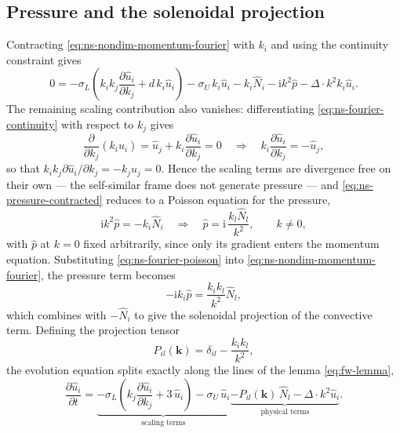 \subsection{Pressure and the solenoidal projection}\label{ssec:ns-projection}
Contracting \eqref{eq:ns-nondim-momentum-fourier} with $k_i$ and using the
continuity constraint gives
\begin{equation}\label{eq:ns-pressure-contracted}
  0 = -\sigma_L \left( k_i k_j \frac{\partial \hat{u}_i}{\partial k_j} + d\, k_i \hat{u}_i \right)
  - \sigma_U\, k_i \hat{u}_i
  - k_i \hat{N}_i
  - \mathrm{i} k^2 \hat{p}
  - \Delta \cdot k^2 k_i \hat{u}_i.
\end{equation}
The remaining scaling contribution also vanishes: differentiating
\eqref{eq:ns-fourier-continuity} with respect to $k_j$ gives
\begin{equation}\label{eq:ns-continuity-dk}
  \frac{\partial}{\partial k_j}\left( k_i \hat{u}_i \right)
  = \hat{u}_j + k_i \frac{\partial \hat{u}_i}{\partial k_j} = 0
  \quad\Longrightarrow\quad
  k_i \frac{\partial \hat{u}_i}{\partial k_j} = -\hat{u}_j,
\end{equation}
so that $k_i k_j \partial \hat{u}_i / \partial k_j = -k_j \hat{u}_j = 0$.
Hence the scaling terms are divergence free on their own --- the self-similar
frame does not generate pressure --- and \eqref{eq:ns-pressure-contracted}
reduces to a Poisson equation for the pressure,
\begin{equation}\label{eq:ns-fourier-poisson}
  \mathrm{i} k^2 \hat{p} = -k_i \hat{N}_i
  \quad\Longrightarrow\quad
  \hat{p} = \mathrm{i}\,\frac{k_l \hat{N}_l}{k^2},
  \qquad k \neq 0,
\end{equation}
with $\hat{p}$ at $k = 0$ fixed arbitrarily, since only its gradient enters
the momentum equation. Substituting \eqref{eq:ns-fourier-poisson} into
\eqref{eq:ns-nondim-momentum-fourier}, the pressure term becomes
\begin{equation}\label{eq:ns-fourier-pressure-substituted}
  -\mathrm{i} k_i \hat{p} = \frac{k_i k_l}{k^2} \hat{N}_l,
\end{equation}
which combines with $-\hat{N}_i$ to give the solenoidal projection of the
convective term. Defining the projection tensor
\begin{equation}\label{eq:ns-projection-tensor}
  P_{il}(\mathbf{k}) = \delta_{il} - \frac{k_i k_l}{k^2},
\end{equation}
the evolution equation splits exactly along the lines of the lemma
\eqref{eq:fw-lemma},
\begin{equation}\label{eq:ns-fourier-final}
  \frac{\partial \hat{u}_i}{\partial t}
  = \underbrace{-\sigma_L \left( k_j \frac{\partial \hat{u}_i}{\partial k_j} + 3\, \hat{u}_i \right)
  - \sigma_U\, \hat{u}_i}_{\text{scaling terms}}
  \underbrace{- P_{il}(\mathbf{k})\, \hat{N}_l
  - \Delta \cdot k^2 \hat{u}_i}_{\text{physical terms}}.
\end{equation}

